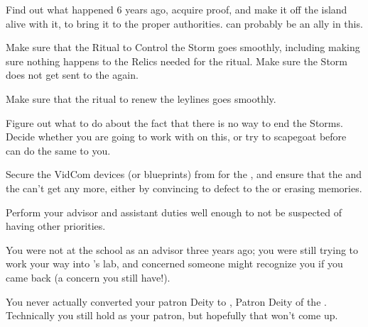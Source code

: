 \documentclass[char]{GL2020}
\begin{document}
\begin{itemz}
	\item Find out what happened 6 years ago, acquire proof, and make it off the island alive with it, to bring it to the proper authorities. \cHeir{} can probably be an ally in this.
	\item Make sure that the Ritual to Control the Storm goes smoothly, including making sure nothing happens to the Relics needed for the ritual. Make sure the Storm does not get sent to the \pShip{} again.
	\item Make sure that the ritual to renew the leylines goes smoothly.
	\item Figure out what to do about the fact that there is no way to end the Storms. Decide whether you are going to work with \cHeadScientist{} on this, or try to scapegoat \cHeadScientist{\them} before \cHeadScientist{\they} can do the same to you.
	\item Secure the VidCom devices (or blueprints) from \cTechStar{} for the \pShip{}, and ensure that the \pTech{} and the \pFarm{} can't get any more, either by convincing \cTechStar{} to defect to the \pShip{} or erasing \cTechStar{\their} memories.
	\item Perform your advisor and assistant duties well enough to not be suspected of having other priorities.
\end{itemz}

\begin{itemz}[Notes]
	\item You were not at the school as an advisor three years ago; you were still trying to work your way into \cHeadScientist{}'s lab, and concerned someone might recognize you if you came back (a concern you still have!).
	\item You never actually converted your patron Deity to \cTechGod{}, Patron Deity of the \pTech{}. Technically you still hold \cFarmGod{} as your patron, but hopefully that won't come up.
\end{itemz}
\end{document}
